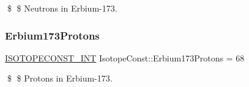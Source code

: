 \$ \$ Neutrons in Erbium-\/173. \mbox{\label{group___isotope_const-_erbium-_er173_ga41ebf010ee83284ef8d893c0bfb5c501}} 
\subsubsection{\texorpdfstring{Erbium173\+Protons}{Erbium173Protons}}
{\footnotesize\ttfamily \mbox{\hyperlink{group___isotope_const-_macros_ga5f18360b3e99483a35c32d789e62621c}{I\+S\+O\+T\+O\+P\+E\+C\+O\+N\+S\+T\+\_\+\+I\+NT}} Isotope\+Const\+::\+Erbium173\+Protons = 68}

\$ \$ Protons in Erbium-\/173. 